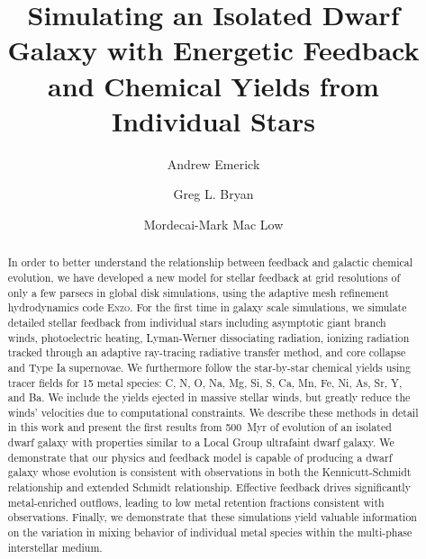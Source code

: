 \documentclass[twocolumn]{aastex61}
\begin{document}
\title{Simulating an Isolated Dwarf Galaxy with Energetic Feedback and Chemical Yields from Individual Stars}

\author{Andrew Emerick}
\author{Greg L. Bryan}
\author{Mordecai-Mark Mac Low}


\begin{abstract}
In order to better understand the relationship between feedback and galactic chemical evolution, we have developed a new model for stellar feedback at grid resolutions of only a few parsecs in global disk simulations, using the adaptive mesh refinement hydrodynamics code \textsc{Enzo}. For the first time in galaxy scale simulations, we simulate detailed stellar feedback from individual stars including asymptotic giant branch winds, photoelectric heating, Lyman-Werner dissociating radiation, ionizing radiation tracked through an adaptive ray-tracing radiative transfer method, and core collapse and Type Ia supernovae. We furthermore follow the star-by-star chemical yields using tracer fields for 15 metal species: C, N, O, Na, Mg, Si, S, Ca, Mn, Fe, Ni, As, Sr, Y, and Ba. We include the yields ejected in massive stellar winds, but greatly reduce the winds' velocities due to computational constraints. We describe these methods in detail in this work and present the first results from 500~Myr of evolution of an isolated dwarf galaxy with properties similar to a Local Group ultrafaint dwarf galaxy. We demonstrate that our physics and feedback model is capable of producing a dwarf galaxy whose evolution is consistent with observations in both the Kennicutt-Schmidt relationship and extended Schmidt relationship. Effective feedback drives significantly metal-enriched outflows, leading to low metal retention fractions consistent with observations. Finally, we demonstrate that these simulations yield valuable information on the variation in mixing behavior of individual metal species within the multi-phase interstellar medium.
\end{abstract}
\end{document}
